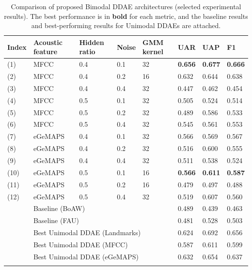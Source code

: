 \begin{table}[htb]
    \small
    \centering
    \caption{Comparison of proposed Bimodal DDAE architectures (selected experimental results). The best performance is in \textbf{bold} for each metric, and the baseline results and best-performing results for Unimodal DDAEs are attached.}
    \begin{tabular}{l|p{1.8cm}|p{1.25cm}|l|p{1.2cm}|l|l|l}
    \Xhline{2\arrayrulewidth}
        Index & Acoustic feature & Hidden ratio & Noise & GMM kernel & UAR & UAP & F1 \\
        \hline
        (1)  & MFCC  & 0.4 & 0.1 & 32 & \textbf{0.656} & \textbf{0.677} & \textbf{0.666} \\
        (2)  & MFCC  & 0.4 & 0.2 & 16 & 0.632 & 0.644 & 0.638 \\
        (3)  & MFCC  & 0.4 & 0.4 & 32 & 0.447 & 0.462 & 0.454 \\
        (4)  & MFCC  & 0.5 & 0.1 & 32 & 0.505 & 0.524 & 0.514 \\
        (5)  & MFCC  & 0.5 & 0.2 & 32 & 0.489 & 0.586 & 0.533 \\
        (6)  & MFCC  & 0.5 & 0.4 & 32 & 0.545 & 0.561 & 0.553 \\
        \hline
        (7)  & eGeMAPS & 0.4 & 0.1 & 32 & 0.566 & 0.569 & 0.567 \\
        (8)  & eGeMAPS & 0.4 & 0.2 & 32 & 0.516 & 0.600 & 0.555 \\
        (9)  & eGeMAPS & 0.4 & 0.4 & 32 & 0.511 & 0.538 & 0.524 \\
        (10) & eGeMAPS & 0.5 & 0.1 & 16 & \textbf{0.566} & \textbf{0.611} & \textbf{0.587} \\
        (11) & eGeMAPS & 0.5 & 0.2 & 16 & 0.479 & 0.497 & 0.488 \\
        (12) & eGeMAPS & 0.5 & 0.4 & 32 & 0.519 & 0.607 & 0.560 \\
        \hline
        & \multicolumn{4}{l|}{Baseline (BoAW)} & 0.489 & 0.439 & 0.463 \\
        & \multicolumn{4}{l|}{Baseline (FAU)} & 0.481 & 0.528 & 0.503 \\
        \hline
        & \multicolumn{4}{l|}{Best Unimodal DDAE (Landmarks)} & 0.624 & 0.692 & 0.656 \\
        & \multicolumn{4}{l|}{Best Unimodal DDAE (MFCC)} & 0.587 & 0.611 & 0.599 \\
        & \multicolumn{4}{l|}{Best Unimodal DDAE (eGeMAPS)} & 0.632 & 0.654 & 0.637 \\
    \Xhline{2\arrayrulewidth}
    \end{tabular}
    \label{tab:bimodal_res}
\end{table}



